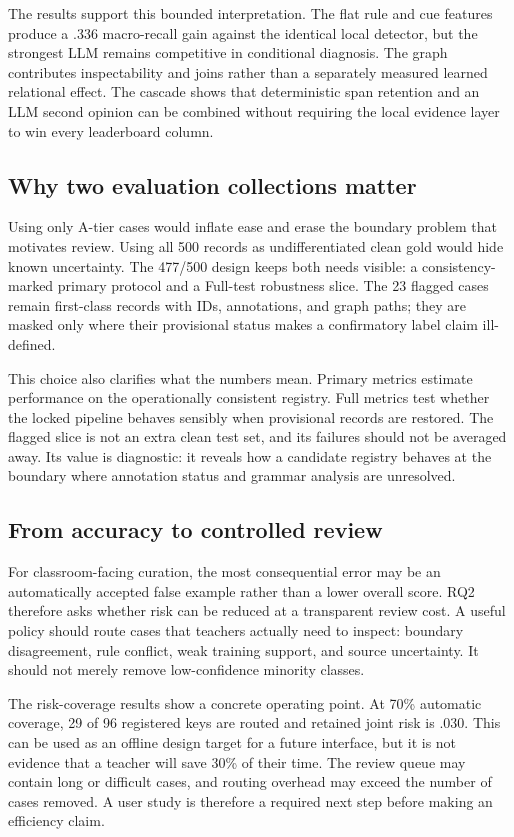 \documentclass{CUP-JNL-NLP}
\begin{document}
The results support this bounded interpretation. The flat rule and cue features produce a .336 macro-recall gain against the identical local detector, but the strongest LLM remains competitive in conditional diagnosis. The graph contributes inspectability and joins rather than a separately measured learned relational effect. The cascade shows that deterministic span retention and an LLM second opinion can be combined without requiring the local evidence layer to win every leaderboard column.

\subsection{Why two evaluation collections matter}
Using only A-tier cases would inflate ease and erase the boundary problem that motivates review. Using all 500 records as undifferentiated clean gold would hide known uncertainty. The 477/500 design keeps both needs visible: a consistency-marked primary protocol and a Full-test robustness slice. The 23 flagged cases remain first-class records with IDs, annotations, and graph paths; they are masked only where their provisional status makes a confirmatory label claim ill-defined.

This choice also clarifies what the numbers mean. Primary metrics estimate performance on the operationally consistent registry. Full metrics test whether the locked pipeline behaves sensibly when provisional records are restored. The flagged slice is not an extra clean test set, and its failures should not be averaged away. Its value is diagnostic: it reveals how a candidate registry behaves at the boundary where annotation status and grammar analysis are unresolved.

\subsection{From accuracy to controlled review}
For classroom-facing curation, the most consequential error may be an automatically accepted false example rather than a lower overall score. RQ2 therefore asks whether risk can be reduced at a transparent review cost. A useful policy should route cases that teachers actually need to inspect: boundary disagreement, rule conflict, weak training support, and source uncertainty. It should not merely remove low-confidence minority classes.

The risk-coverage results show a concrete operating point. At 70\% automatic coverage, 29 of 96 registered keys are routed and retained joint risk is .030. This can be used as an offline design target for a future interface, but it is not evidence that a teacher will save 30\% of their time. The review queue may contain long or difficult cases, and routing overhead may exceed the number of cases removed. A user study is therefore a required next step before making an efficiency claim.
\end{document}
